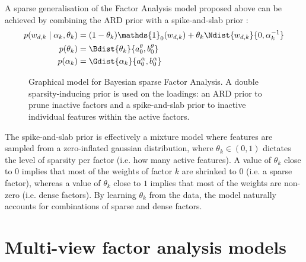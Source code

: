 A sparse generalisation of the Factor Analysis model proposed above can be achieved by combining the ARD prior with a spike-and-slab prior \cite{Mitchell1988,Titsias2011}:
\begin{align}
	p(w_{d,k} \mid \alpha_k,\theta_k) &= (1-\theta_k) \mathds{1}_0(w_{d,k}) + \theta_k \Ndist{w_{d,k}}{0, \alpha_k^{-1}} \\
	p(\theta_k) &= \Bdist{\theta_k}{a_0^\theta,b_0^\theta} \\
	p(\alpha_k) &= \Gdist{\alpha_k}{a_0^\alpha, b_0^\alpha}
\end{align}

\begin{figure}[H] \begin{center}
	
	\label{fig:bayesianFA}
	\caption{Graphical model for Bayesian sparse Factor Analysis. A double sparsity-inducing prior is used on the loadings: an ARD prior to prune inactive factors and a spike-and-slab prior to inactive individual features within the active factors.}
\end{center} \end{figure}

The spike-and-slab prior is effectively a mixture model where features are sampled from a zero-inflated gaussian distribution, where $\theta_k \in (0,1)$ dictates the level of sparsity per factor (i.e. how many active features). A value of $\theta_k$ close to $0$ implies that most of the weights of factor $k$ are shrinked to $0$ (i.e. a sparse factor), whereas a value of $\theta_k$ close to $1$ implies that most of the weights are non-zero (i.e. dense factors). By learning $\theta_k$ from the data, the model naturally accounts for combinations of sparse and dense factors.





\section{Multi-view factor analysis models}

